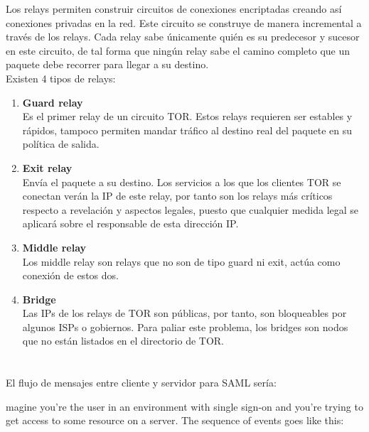 \documentclass[10pt,a4paper]{article}
\begin{document}
Los relays permiten construir circuitos de conexiones encriptadas creando así conexiones privadas en la red. Este circuito se construye de manera incremental a través de los relays. Cada relay sabe únicamente quién es su predecesor y sucesor en este circuito, de tal forma que ningún relay sabe el camino completo que un paquete debe recorrer para llegar a su destino.\\

Existen 4 tipos de relays:

\begin{enumerate}
\item \textbf{Guard relay}\\
Es el primer relay de un circuito TOR. Estos relays requieren ser estables y rápidos, tampoco permiten mandar tráfico al destino real del paquete en su política de salida.
\item \textbf{Exit relay}\\
Envía el paquete a su destino. Los servicios a los que los clientes TOR se conectan verán la IP de este relay, por tanto son los relays más críticos respecto a revelación y aspectos legales, puesto que cualquier medida legal se aplicará sobre el responsable de esta dirección IP.
\item \textbf{Middle relay}\\
Los middle relay son relays que no son de tipo guard ni exit, actúa como conexión de estos dos.
\item \textbf{Bridge}\\
Las IPs de los relays de TOR son públicas, por tanto, son bloqueables por algunos ISPs o gobiernos. Para paliar este problema, los bridges son nodos que no están listados en el directorio de TOR.
\end{enumerate}



\section{}
\subsection{}
El flujo de mensajes entre cliente y servidor para SAML sería:

magine you're the user in an environment with single sign-on and you're trying to get access to some resource on a server. The sequence of events goes like this:
\end{document}
